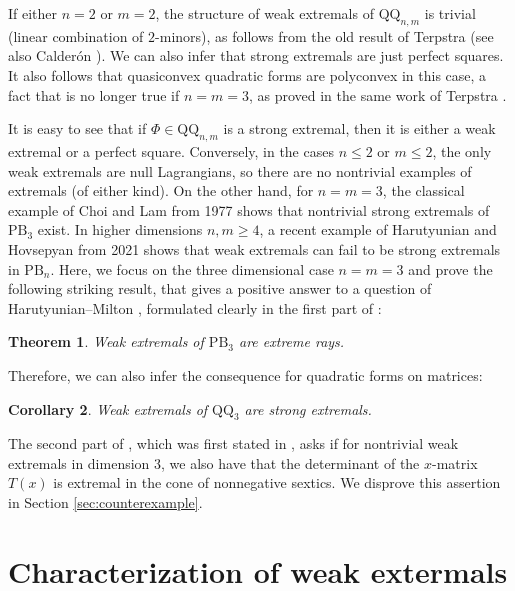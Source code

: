 \documentclass[a4paper]{article}
\numberwithin{equation}{section}
\newtheorem{theorem}{Theorem}[section]
\newtheorem{cor}[theorem]{Corollary}
\theoremstyle{definition}
\theoremstyle{remark}
\newcommand{\qqnm}{\mathrm{QQ}_{n,m}}
\begin{document}
If either $n=2$ or $m=2$, the structure of weak extremals of $\qqnm$ is trivial (linear combination of $2$-minors), as follows from the old result of Terpstra \cite{terpstra} (see also Calder\'on \cite{calderon}). We can also infer that strong extremals are just perfect squares. It also follows that quasiconvex quadratic forms are polyconvex in this case, a fact that is no longer true if $n=m=3$, as proved in the same work of Terpstra \cite{terpstra}.

It is easy to see that if $\Phi\in\qqnm$ is a strong extremal, then it is either  a weak extremal or a perfect square. Conversely, in the cases $n\leq 2$ or $m\leq 2$, the only weak extremals are null Lagrangians, so there are no nontrivial examples of extremals (of either kind). On the other hand, for $n=m=3$, the classical example of Choi and Lam from 1977 \cite{choilamzbMATH03540962} shows that nontrivial strong extremals of $\mathrm{PB}_3$ exist. In higher dimensions $n,m\geq4$, a recent example of Harutyunian and Hovsepyan from 2021 shows that weak extremals can fail to be strong extremals in $\mathrm{PB}_n$. Here, we focus on the three dimensional case $n=m=3$ and prove the following striking result, that gives a positive answer to a question of Harutyunian--Milton \cite{HarutyunyanMiltonCPAM}, formulated clearly in the first part of \cite[Conj. 2.7]{harutyunyan2021extreme}:
\begin{theorem}\label{thm:main}
Weak extremals of $\mathrm{PB}_3$ are extreme rays.
\end{theorem}
Therefore, we can also infer the consequence for quadratic forms on matrices:
\begin{cor}\label{cor:main}
Weak extremals of $\mathrm{QQ}_3$ are strong extremals.
\end{cor}
The second part of \cite[Conj. 2.7]{harutyunyan2021extreme}, which was first stated in \cite[Conj. 2.8]{HarutyunyanMiltonCPAM}, asks if for nontrivial weak extremals in dimension 3, we also have that the determinant of the $x$-matrix $T(x)$ is extremal in the cone of nonnegative sextics. We disprove this assertion in Section \ref{sec:counterexample}.

\section{Characterization of weak extermals}\label{sec:weak_extremal_char}
\end{document}
